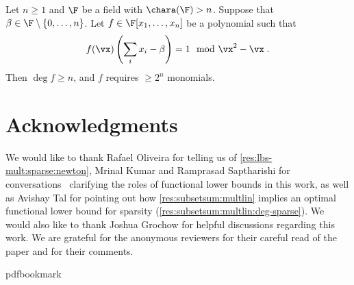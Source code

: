 \documentclass[11pt]{article}
\numberwithin{equation}{section}
\theoremstyle{definition}
\theoremstyle{plain}
\begin{document}
\begin{corollarywp}\label{res:subsetsum:multlin:deg-sparse}
        Let $n\ge 1$ and $\F$ be a field with $\chara(\F)>n$.  Suppose that $\beta\in \F\setminus\{0,\ldots,n\}$. Let $f\in\F[x_1,\ldots,x_n]$ be a polynomial such that
        \[
                f(\vx)\left(\sum_i x_i-\beta\right)=1 \mod \vx^2-\vx
                \;.
        \]
        Then $\deg f\ge n$, and $f$ requires $\ge 2^n$ monomials.
\end{corollarywp}


%
%
%


\section*{Acknowledgments}

We would like to thank Rafael %
Oliveira  %
for telling us of \autoref{res:lbs-mult:sparse:newton}, Mrinal Kumar and Ramprasad Saptharishi for conversations~\cite{ForbesKS16} clarifying the roles of functional lower bounds in this work, as well as Avishay Tal for pointing out how \autoref{res:subsetsum:multlin} implies an optimal functional lower bound for sparsity (\autoref{res:subsetsum:multlin:deg-sparse}).  We would also like to thank Joshua Grochow for helpful discussions regarding this work. We are grateful for the anonymous reviewers for their careful read of the paper and for their comments.


%
%
%



%
\nocite{GuptaKKS13b}
\nocite{CookReckhow74b}


\newcommand{\prelim}{Preliminary version in\ }\newcommand{\prelims}{Preliminary
  versions in\ }
\providecommand{\bibhead}[1]{}
\expandafter\ifx\csname pdfbookmark\endcsname\relax%
  \providecommand{\tocrefpdfbookmark}{}
\else\providecommand{\tocrefpdfbookmark}{%
   \hypertarget{tocreferences}{}%
   \pdfbookmark[1]{References}{tocreferences}}%
\fi
\end{document}
